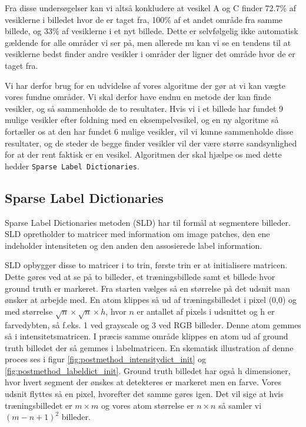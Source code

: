 Fra disse undersøgelser kan vi altså konkludere at vesikel A og C finder 72.7\% af vesiklerne i billedet hvor de er taget fra, 100\% af et andet område fra samme billede, og 33\% af vesiklerne i et nyt billede. Dette er selvfølgelig ikke automatisk gældende for alle områder vi ser på, men allerede nu kan vi se en tendens til at vesiklerne bedst finder andre vesikler i områder der ligner det område hvor de er taget fra.

Vi har derfor brug for en udvidelse af vores algoritme der gør at vi kan vægte vores fundne områder. Vi skal derfor have endnu en metode der kan finde vesikler, og så sammenholde de to resultater. Hvis vi i et billede har fundet 9 mulige vesikler efter foldning med en eksempelvesikel, og en ny algoritme så fortæller os at den har fundet 6 mulige vesikler, vil vi kunne sammenholde disse resultater, og de steder de begge finder vesikler vil der være større sandsynlighed for at der rent faktisk er en vesikel. Algoritmen der skal hjælpe os med dette hedder \texttt{Sparse Label Dictionaries}. 

\subsection{Sparse Label Dictionaries}	%

Sparse Label Dictionaries metoden (SLD) har til formål at segmentere billeder. SLD opretholder to matricer med information om image patches, den ene indeholder intensiteten og den anden den assosierede label information.

SLD opbygger disse to matricer i to trin, første trin er at initialisere matricen. Dette gøres ved at se på to billeder, et træningsbillede samt et billede hvor ground truth er markeret. Fra starten vælges så en størrelse på det udsnit man ønsker at arbejde med. En atom klippes så ud af træningsbilledet i pixel (0,0) og med størrelse $\sqrt{n}\times\sqrt{n}\times h$, hvor $n$ er antallet af pixels i udsnittet og h er farvedybten, så f.eks. 1 ved grayscale og 3 ved RGB billeder. Denne atom gemmes så i intensitetsmatricen. I præcis samme område klippes en atom ud af ground truth billedet der så gemmes i labelmatricen. En skematisk illustration af denne proces ses i figur \ref{fig:postmethod_intensitydict_init} og \ref{fig:postmethod_labeldict_init}. Ground truth billedet har også h dimensioner, hvor hvert segment der ønskes at detekteres er markeret men en farve. Vores udsnit flyttes så en pixel, hvorefter det samme gøres igen. Det vil sige at hvis træningsbilledet er $m\times m$ og vores atom størrelse er $n\times n$ så samler vi $(m-n+1)^2$ billeder. 

